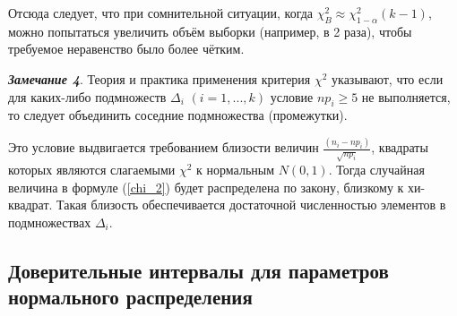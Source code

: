\documentclass[a4paper]{article}
\begin{document}
Отсюда следует, что при сомнительной ситуации, когда $\chi^{2}_{B} \approx \chi^{2}_{1-\alpha}(k-1)$, можно попытаться увеличить объём выборки (например, в 2 раза), чтобы требуемое неравенство было более чётким.

\textbf{\textit{Замечание 4}}. Теория и практика применения критерия  $\chi^{2}$ указывают, что если для каких-либо подмножеств $\Delta_{i}$ $(i = 1, ... ,k)$ условие $np_{i} \geq 5$ не выполняется, то следует объединить соседние подмножества (промежутки).

Это условие выдвигается требованием близости величин $\frac{(n_{i} -np_{i})}{\sqrt{np_{i}}}$, квадраты которых являются слагаемыми $\chi^{2}$  к нормальным $N(0,1)$. Тогда случайная величина в формуле (\ref{chi_2}) будет распределена по закону, близкому к хи-квадрат. Такая близость обеспечивается достаточной численностью элементов в подмножествах $\Delta_{i}$.
\subsection{Доверительные интервалы для параметров нормального распределения}
\end{document}

